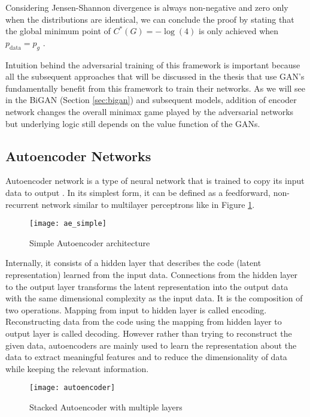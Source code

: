 {Considering Jensen-Shannon divergence is always non-negative and zero only when the distributions
are identical, we can conclude the proof by stating that the global minimum point of $C^*(G) = -
\log(4)$ is only achieved when $p_{\text{data}} = p_g$ .

Intuition behind the adversarial training of this framework is important because all the subsequent
approaches that will be discussed in the thesis that use GAN's fundamentally benefit from this
framework to train their networks. As we will see in the BiGAN (Section \ref{sec:bigan}) and subsequent models, addition of
encoder network changes the overall minimax game played by the adversarial networks but underlying
logic still depends on the value function of the GANs.

\subsection{Autoencoder Networks}
\label{sec:ae}
 
Autoencoder network is a type of neural network that is trained to copy its input data to output
\cite{Goodfellow-et-al-2016}. In its simplest form, it can be defined as a feedforward, 
non-recurrent network similar to multilayer perceptrons like in Figure \ref{fig:ae_simple}.
\begin{figure}[h!]
	\centering
	\texttt{[image: ae\_simple]}
    \caption{Simple Autoencoder architecture}
    \label{fig:ae_simple}
\end{figure}

Internally, it consists of a hidden layer that describes the code (latent representation) 
learned from the input data. Connections from the hidden layer to the output layer transforms 
the latent representation into the output data with the same dimensional complexity as the input 
data. It is the composition of two operations. Mapping from input to hidden layer is called encoding. 
Reconstructing data from the code using the mapping from hidden layer to output layer is called 
decoding. However rather than trying to reconstruct the given data, autoencoders are mainly used 
to learn the representation about the data to extract meaningful features and to reduce the 
dimensionality of data while keeping the relevant information.

\begin{figure}[h!]
	\centering
	\texttt{[image: autoencoder]}
    \caption{Stacked Autoencoder with multiple layers}
    \label{fig:ae_deep}
\end{figure}

}
